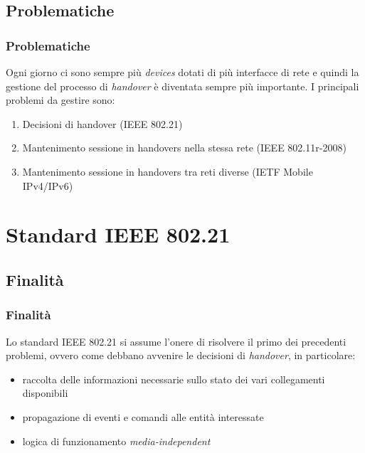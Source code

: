 \documentclass[10pt]{beamer}
\begin{document}
\subsection{Problematiche}
\begin{frame}
\frametitle{Problematiche}
Ogni giorno ci sono sempre più {\em devices} dotati di più interfacce di rete e quindi la gestione del processo di {\em handover} è diventata sempre più importante. I principali problemi da gestire sono:
\begin{enumerate}
\item Decisioni di handover (IEEE 802.21)
\item Mantenimento sessione in handovers nella stessa rete (IEEE 802.11r-2008)
\item Mantenimento sessione in handovers tra reti diverse (IETF Mobile IPv4/IPv6)
\end{enumerate}
\end{frame}


\section{Standard IEEE 802.21}
\subsection{Finalità}
\begin{frame}
\frametitle{Finalità}
Lo standard IEEE 802.21 si assume l'onere di risolvere il primo dei precedenti problemi, ovvero come debbano avvenire le decisioni di {\em handover}, in particolare:
\begin{itemize}
\item raccolta delle informazioni necessarie sullo stato dei vari collegamenti disponibili
\item propagazione di eventi e comandi alle entità interessate
\item logica di funzionamento {\em media-independent}
\end{itemize}
\end{frame}
\end{document}
